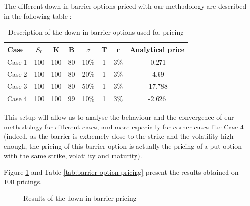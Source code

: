 \documentclass[a4paper,11pt,english]{book}
\begin{document}
The different down-in barrier options priced with our methodology are described in the following table :

\begin{table}[H]
\begin{center}
\begin{tabular}{l c c c c c c c} 
\cmidrule(l){1-8} 
Case & $S_{0}$ & K & B & $\sigma$ & T & r & Analytical price\\ %
\midrule %
Case 1 	&   100 &   100 &   80  & 	10\%    &   1    &   3\%    & -0.271\\
Case 2	&   100 &   100 &	80  & 	20\%    &   1    &   3\%    & -4.69\\
Case 3 &    100 &   100 &   80  &	50\%    &   1    &   3\%    & -17.788\\
Case 4 	&   100 &   100 &   99  &	10\%    &   1    &   3\%    & -2.626\\
\bottomrule %
\end{tabular}
\end{center}
    \caption{Description of the down-in barrier options used for pricing}
    \label{down-in-barriers}
\end{table}

This setup will allow us to analyse the behaviour and the convergence of our methodology for different cases, and more especially for corner cases like Case 4 (indeed, as the barrier is extremely close to the strike and the volatility high enough, the pricing of this barrier option is actually the pricing of a put option with the same strike, volatility and maturity).

Figure \ref{fig:down-in-barrier-pricing} and Table \ref{tab:barrier-option-pricing} present the results obtained on 100 pricings.

\begin{figure}[H]
\begin{center}
    \caption{Results of the down-in barrier pricing}
    \label{fig:down-in-barrier-pricing}
\end{center}
\end{figure}
\end{document}
